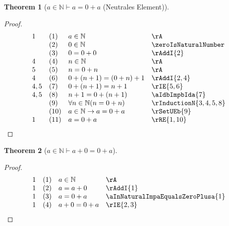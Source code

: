 \documentclass{book}
\theoremstyle{plain}
\newtheorem{theorem}{Theorem}
\theoremstyle{remark}
\theoremstyle{definition}
\begin{document}
\label{aInNaturalImpaEqualsZeroPlusa}
\begin{theorem}[\(a\in\mathbb{N}\vdash a=0+a\) (Neutrales Element)]
\end{theorem}
\begin{proof}
        \[
	\begin{array}{llll}
            1   &  (1) & a\in\mathbb{N} & \rA \\
                &  (2) & 0\in\mathbb{N} & \zeroIsNaturalNumber \\
                &  (3) & 0=0+0 & \rAddI{2} \\
            4   &  (4) & n\in\mathbb{N} & \rA \\
            5   &  (5) & n=0+n & \rA \\
            4   &  (6) & 0+(n+1)=(0+n)+1 & \rAddI{2,4} \\
            4,5 &  (7) & 0+(n+1)=n+1 & \rIE{5,6} \\
            4,5 &  (8) & n+1=0+(n+1) & \aIdbImpbIda{7} \\
                &  (9) & \forall n\in\mathbb{N}(n=0+n) & \rInductionN{3,4,5,8} \\
                &  (10) & a\in\mathbb{N}\rightarrow a=0+a & \rSetUEb{9} \\
            1   &  (11) & a=0+a & \rRE{1,10} \\
	\end{array}
	\]
\end{proof}

\label{aInNaturalImpaPlusZeroEqualsZeroPlusa}
\begin{theorem}[\(a\in\mathbb{N}\vdash a+0=0+a\)]
\end{theorem}
\begin{proof}
        \[
	\begin{array}{llll}
            1   &  (1) & a\in\mathbb{N} & \rA \\
            1   &  (2) & a = a+0 & \rAddI{1} \\
            1   &  (3) & a = 0+a & \aInNaturalImpaEqualsZeroPlusa{1} \\
            1   &  (4) & a+0 = 0+a & \rIE{2,3} \\
	\end{array}
	\]
\end{proof}
\end{document}

